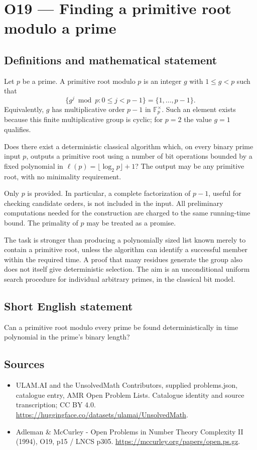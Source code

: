 \documentclass[11pt,a4paper]{article}
\begin{document}
\section*{O19 — Finding a primitive root modulo a prime}\label{statement}

\subsection{Definitions and mathematical statement}
Let $p$ be a prime. A primitive root modulo $p$ is an integer $g$ with $1\le g<p$ such that
\[
\{g^j\bmod p:0\le j<p-1\}=\{1,\ldots,p-1\}.
\]
Equivalently, $g$ has multiplicative order $p-1$ in $\mathbb F_p^\times$. Such an element exists because this finite multiplicative group is cyclic; for $p=2$ the value $g=1$ qualifies.

Does there exist a deterministic classical algorithm which, on every binary prime input $p$, outputs a primitive root using a number of bit operations bounded by a fixed polynomial in $\ell(p)=\lfloor\log_2p\rfloor+1$? The output may be any primitive root, with no minimality requirement.

Only $p$ is provided. In particular, a complete factorization of $p-1$, useful for checking candidate orders, is not included in the input. All preliminary computations needed for the construction are charged to the same running-time bound. The primality of $p$ may be treated as a promise.

The task is stronger than producing a polynomially sized list known merely to contain a primitive root, unless the algorithm can identify a successful member within the required time. A proof that many residues generate the group also does not itself give deterministic selection. The aim is an unconditional uniform search procedure for individual arbitrary primes, in the classical bit model.
\subsection{Short English statement}
Can a primitive root modulo every prime be found deterministically in time polynomial in the prime’s binary length?
\subsection{Sources}
\begin{itemize}
\item[S1] ULAM.AI and the UnsolvedMath Contributors, supplied problems.json, catalogue entry, AMR Open Problem Lists. Catalogue identity and source transcription; CC BY 4.0.
\url{https://huggingface.co/datasets/ulamai/UnsolvedMath}.
\item[S2] Adleman \& McCurley - Open Problems in Number Theory Complexity II (1994), O19, p15 / LNCS p305. 
\url{https://mccurley.org/papers/open.ps.gz}.
\end{itemize}
\end{document}
